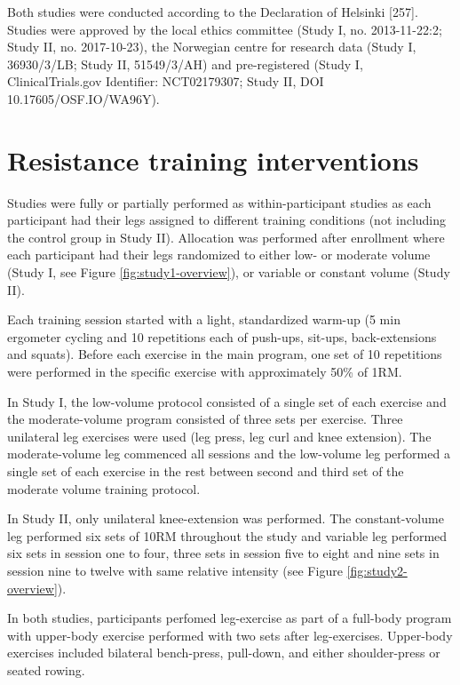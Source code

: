 \documentclass[twoside,10pt]{gihclass} %
\begin{document}
Both studies were conducted according to the Declaration of Helsinki
{[}257{]}.
Studies were approved by the local ethics committee (Study I, no. 2013-11-22:2; Study II, no. 2017-10-23), the Norwegian centre for research data (Study I, 36930/3/LB; Study II, 51549/3/AH) and pre-registered (Study I, ClinicalTrials.gov Identifier: NCT02179307; Study II, DOI 10.17605/OSF.IO/WA96Y).

\hypertarget{resistance-training-interventions}{%
\section{Resistance training interventions}\label{resistance-training-interventions}}

Studies were fully or partially performed as within-participant studies
as each participant had their legs assigned to different training
conditions (not including the control group in Study II). Allocation was
performed after enrollment where each participant had their legs
randomized to either low- or moderate volume (Study I, see Figure \ref{fig:study1-overview}), or variable or constant volume (Study II).

Each training session started with a light, standardized warm-up (5 min
ergometer cycling and 10 repetitions each of push-ups, sit-ups,
back-extensions and squats). Before each exercise in the main program,
one set of 10 repetitions were performed in the specific exercise with
approximately 50\% of 1RM.

In Study I, the low-volume protocol consisted of a single set of each
exercise and the moderate-volume program consisted of three sets per exercise.
Three unilateral leg exercises were used (leg press, leg curl and knee
extension). The moderate-volume leg commenced all sessions and the low-volume leg performed a single set of each exercise in the rest between
second and third set of the moderate volume training protocol.

In Study II, only unilateral knee-extension was performed. The constant-volume leg performed six sets of 10RM throughout the study and variable leg performed six sets in session one to four, three sets in session five to eight and nine sets in session nine to twelve with same relative intensity (see Figure \ref{fig:study2-overview}).

In both studies, participants perfomed leg-exercise as part of a full-body program with upper-body exercise performed with two sets after leg-exercises. Upper-body exercises included bilateral bench-press, pull-down, and either shoulder-press or seated rowing.
\end{document}
